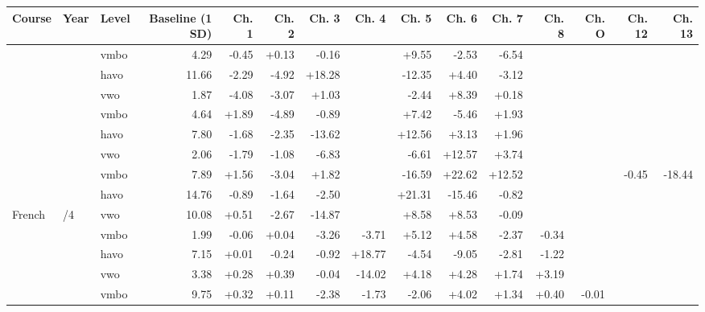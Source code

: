 
\begin{tabular}{lllrrrrrrrrrrrr}
\toprule
Course & Year & Level & Baseline (1 SD) & Ch. 1 & Ch. 2 & Ch. 3 & Ch. 4 & Ch. 5 & Ch. 6 & Ch. 7 & Ch. 8 & Ch. O & Ch. 12 & Ch. 13\\
\midrule
 &  & vmbo & 4.29 & -0.45 & +0.13 & -0.16 &  & +9.55 & -2.53 & -6.54 &  &  &  & \\

 &  & havo & 11.66 & -2.29 & -4.92 & +18.28 &  & -12.35 & +4.40 & -3.12 &  &  &  & \\

 & \multirow[t]{-3}{*}{\raggedright\arraybackslash 1} & vwo & 1.87 & -4.08 & -3.07 & +1.03 &  & -2.44 & +8.39 & +0.18 &  &  &  & \\

 &  & vmbo & 4.64 & +1.89 & -4.89 & -0.89 &  & +7.42 & -5.46 & +1.93 &  &  &  & \\

 &  & havo & 7.80 & -1.68 & -2.35 & -13.62 &  & +12.56 & +3.13 & +1.96 &  &  &  & \\

 & \multirow[t]{-3}{*}{\raggedright\arraybackslash 2} & vwo & 2.06 & -1.79 & -1.08 & -6.83 &  & -6.61 & +12.57 & +3.74 &  &  &  & \\

 &  & vmbo & 7.89 & +1.56 & -3.04 & +1.82 &  & -16.59 & +22.62 & +12.52 &  &  & -0.45 & -18.44\\

 &  & havo & 14.76 & -0.89 & -1.64 & -2.50 &  & +21.31 & -15.46 & -0.82 &  &  &  & \\

\multirow[t]{-9}{*}{\raggedright\arraybackslash French} & \multirow[t]{-3}{*}{\raggedright\arraybackslash 3/4} & vwo & 10.08 & +0.51 & -2.67 & -14.87 &  & +8.58 & +8.53 & -0.09 &  &  &  & \\
\cmidrule{1-15}
 &  & vmbo & 1.99 & -0.06 & +0.04 & -3.26 & -3.71 & +5.12 & +4.58 & -2.37 & -0.34 &  &  & \\

 &  & havo & 7.15 & +0.01 & -0.24 & -0.92 & +18.77 & -4.54 & -9.05 & -2.81 & -1.22 &  &  & \\

 & \multirow[t]{-3}{*}{\raggedright\arraybackslash 1} & vwo & 3.38 & +0.28 & +0.39 & -0.04 & -14.02 & +4.18 & +4.28 & +1.74 & +3.19 &  &  & \\

 &  & vmbo & 9.75 & +0.32 & +0.11 & -2.38 & -1.73 & -2.06 & +4.02 & +1.34 & +0.40 & -0.01 &  & \\


\end{tabular}
